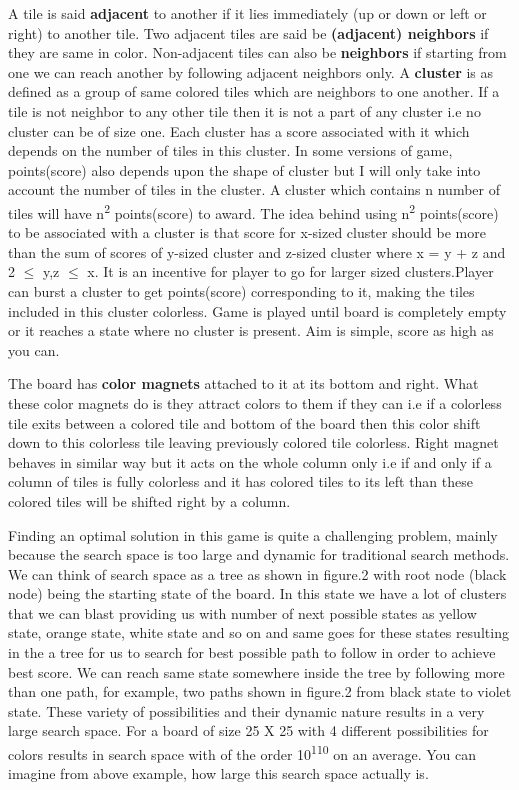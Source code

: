 \documentclass[twoside]{article}
\begin{document}
\begin{multicols}{2}
A tile is said \textbf{adjacent} to another if it lies immediately (up or down or 
left or right) to another tile. Two adjacent tiles are said be \textbf{(adjacent) neighbors} if they are same in color.
Non-adjacent tiles can also be \textbf{neighbors} if starting from one we can reach another by following adjacent
neighbors only. A \textbf{cluster} is as defined as a group of same colored tiles which are neighbors to one another.
If a tile is not neighbor to any other tile then it is not a part of any cluster i.e no cluster can be of size one.
Each cluster has a score associated with it which depends on the number of tiles in this cluster. In some versions of
game, points(score) also depends upon the shape of cluster but I will only take into account the number of tiles in the cluster.
A cluster which contains n number of tiles will have n\textsuperscript{2} points(score) to award. The idea behind using 
n\textsuperscript{2} points(score) to be associated with a cluster is that score for x-sized cluster should be more than the 
sum of scores of y-sized cluster and z-sized cluster where x = y + z and 2 $\leq$ y,z $\leq$ x. It is an incentive for
player to go for larger sized clusters.Player can burst a cluster to get points(score) corresponding to it, making the tiles 
included in this cluster colorless. Game is played until board is completely empty or it reaches a state where no cluster is 
present. Aim is simple, score as high as you can.

The board has \textbf{color magnets} attached to it at its bottom and right. What these color magnets do is they attract colors 
to them if they can i.e if a colorless tile exits between a colored tile and bottom of the board then this color shift down to this 
colorless tile leaving previously colored tile colorless. Right magnet behaves in similar way but it acts on the whole column only
i.e if and only if a column of tiles is fully colorless and it has colored tiles to its left than these colored tiles will be 
shifted right by a column.

Finding an optimal solution in this game is quite a challenging problem, mainly because the search space is too large and dynamic
for traditional search methods. We can think of search space as a tree as shown in figure.2 with root node (black node) being the
starting state of the board. In this state we have a lot of clusters that we can blast providing us with number of next possible 
states as yellow state, orange state, white state and so on and same goes for these states resulting in the a tree for us to search
for best possible path to follow in order to achieve best score. We can reach same state somewhere inside the tree by following 
more than one path, for example, two paths shown in figure.2 from black state to violet state. These variety of possibilities and
their dynamic nature results in a very large search space. For a board of size 25 X 25 with 4 different possibilities for colors 
results in search space with of the order 10\textsuperscript{110} on an average. You can imagine from above example, how large 
this search space actually  is.


\end{multicols}
\end{document}
